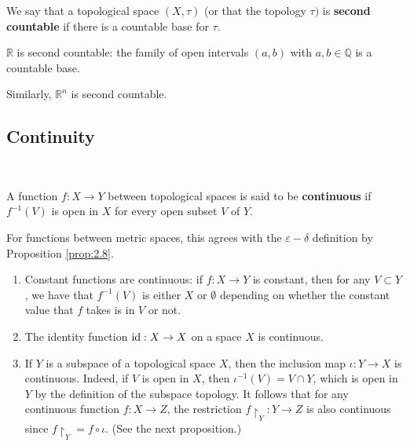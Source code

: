 \documentclass[a4paper,11pt]{article}
\begin{document}
\begin{definition}
    We say that a topological space $(X, \tau)$ (or that the topology $\tau)$ is \textbf{second countable} if there is a countable base for $\tau$.
\end{definition}
\begin{example}
    $\mathbb{R}$ is second countable: the family of open intervals $(a, b)$ with $a, b \in \mathbb{Q}$ is a countable base.

Similarly, $\mathbb{R}^{n}$ is second countable.

\end{example}

\subsection{Continuity}\ \vspace{-1.5em}
\begin{definition}
    A function $f: X \rightarrow Y$ between topological spaces is said to be \textbf{continuous} if $f^{-1}(V)$ is open in $X$ for every open subset $V$ of $Y$.
\end{definition}
\begin{note}
    For functions between metric spaces, this agrees with the $\varepsilon-\delta$ definition by Proposition \ref{prop:2.8}.
\end{note}

\begin{example}
    \begin{enumerate}
        \item Constant functions are continuous: if $f: X \rightarrow Y$ is constant, then for any $V \subset Y$, we have that $f^{-1}(V)$ is either $X$ or $\emptyset$ depending on whether the constant value that $f$ takes is in $V$ or not.
      
        \item The identity function $\operatorname{id}: X \rightarrow X$ on a space $X$ is continuous.
      
        \item If $Y$ is a subspace of a topological space $X$, then the inclusion map $\iota: Y \rightarrow X$ is continuous. Indeed, if $V$ is open in $X$, then $\iota^{-1}(V)=V \cap Y$, which is open in $Y$ by the definition of the subspace topology. It follows that for any continuous function $f: X \rightarrow Z$, the restriction $f\restriction_{Y}: Y \rightarrow Z$ is also continuous since $f\restriction_{Y}=f \circ \iota$. (See the next proposition.)
      
      \end{enumerate}
\end{example}
\end{document}
